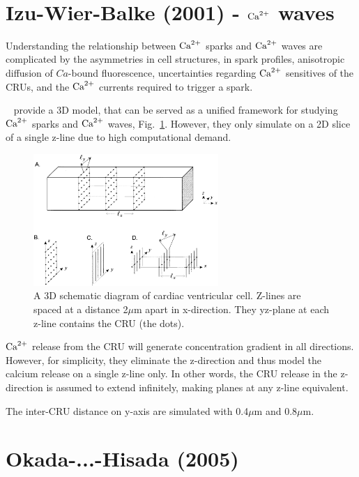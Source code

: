 ~\citep{dupont1996}



\section{Izu-Wier-Balke (2001) - ${\text{Ca}^{2+}}$ waves}
\label{sec:izu-wier-balke}


Understanding the relationship between ${\text{Ca}^{2+}}$ sparks and ${\text{Ca}^{2+}}$ waves
are complicated by the asymmetries in cell structures, in spark
profiles, anisotropic diffusion of $Ca$-bound fluorescence,
uncertainties regarding ${\text{Ca}^{2+}}$ sensitives of the CRUs, and the ${\text{Ca}^{2+}}$
currents required to trigger a spark. 

~\citep{izu2001} provide a 3D model, that can be served as a unified
framework for studying ${\text{Ca}^{2+}}$ sparks and ${\text{Ca}^{2+}}$ waves,
Fig.~\ref{fig:Izu_cell}. However, they only simulate on a 2D slice of
a single z-line due to high computational demand.

\begin{figure}[hbt]
  \centerline{\includegraphics[height=5cm,
    angle=0]{./images/Izu_2001_cell.eps}}
\caption{A 3D schematic diagram of cardiac ventricular cell. Z-lines
  are spaced at a distance 2$\mu$m apart in x-direction. They yz-plane
  at each z-line contains the CRU (the dots).}
\label{fig:Izu_cell}
\end{figure}

${\text{Ca}^{2+}}$ release from the CRU will generate concentration gradient in
all directions. However, for simplicity, they eliminate the
z-direction and thus model the calcium release on a single z-line
only. In other words, the CRU release in the z-direction is assumed
to extend infinitely, making planes at any z-line equivalent. 


The inter-CRU distance on y-axis are simulated with 0.4$\mu$m and
0.8$\mu$m. 
\section{Okada-...-Hisada (2005)}
\label{sec:okada-...-hisada}

